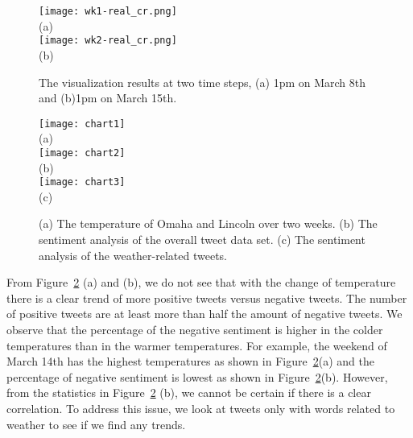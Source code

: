 \begin{figure}[t]
\begin{center}
\texttt{[image: wk1-real\_cr.png]} \\
\mbox{\small{(a)}}\\
\texttt{[image: wk2-real\_cr.png]} \\
\mbox{\small{(b)}}
\end{center}
\vspace{-.1in}
\caption{The visualization results at two time steps, (a) 1pm on March 8th and (b)1pm on March 15th.}
\label{fig:cities}
\end{figure}

\begin{figure}[t]
\begin{center}
\texttt{[image: chart1]} \\
\mbox{\small{(a)}}\\
\texttt{[image: chart2]} \\
\mbox{\small{(b)}}\\
\texttt{[image: chart3]} \\
\mbox{\small{(c)}}
\end{center}
\vspace{-.1in}
\caption{(a) The temperature of Omaha and Lincoln over two weeks. (b) The sentiment analysis of the overall tweet data set. (c) The sentiment analysis of the weather-related tweets.}
\label{fig:chart_1}
\end{figure}

From Figure~\ref{fig:chart_1} (a) and (b), we do not see that with the change of temperature there is a clear trend of more positive tweets versus negative tweets. The number of positive tweets are at least more than half the amount of negative tweets. We observe that the percentage of the negative sentiment is higher in the colder temperatures than in the warmer temperatures. For example, the weekend of March 14th has the highest temperatures as shown in Figure~\ref{fig:chart_1}(a) and the percentage of negative sentiment is lowest as shown in Figure~\ref{fig:chart_1}(b). However, from the statistics in Figure~\ref{fig:chart_1} (b), we cannot be certain if there is a clear correlation. To address this issue, we look at tweets only with words related to weather to see if we find any trends.

